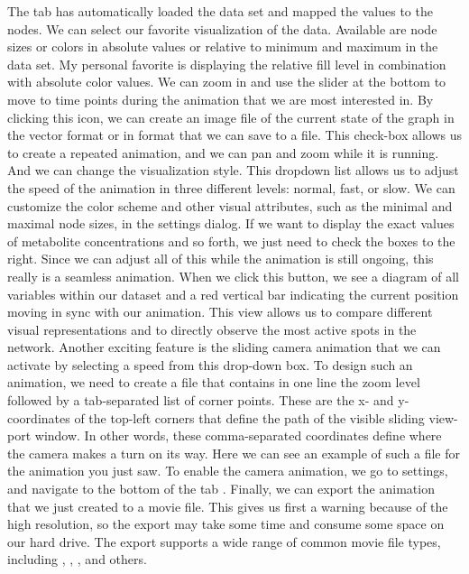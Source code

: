 The  tab has automatically loaded the data set and mapped the values to the nodes. 
We can select our favorite visualization of the data. Available are node sizes or colors in absolute values or relative to minimum and maximum in the data set.
My personal favorite is displaying the relative fill level in combination with absolute color values.
We can zoom in and use the slider at the bottom to move to time points during the animation that we are most interested in.
By clicking this icon, we can create an image file of the current state of the graph in the vector format \SVG or in \PNG format that we can save to a file.
This check-box allows us to create a repeated animation, and we can pan and zoom while it is running. And we can change the visualization style.
This dropdown list allows us to adjust the speed of the animation in three different levels: normal, fast, or slow.
We can customize the color scheme and other visual attributes, such as the minimal and maximal node sizes, in the settings dialog.
If we want to display the exact values of metabolite concentrations and so forth, we just need to check the boxes to the right.
Since we can adjust all of this while the animation is still ongoing, this really is a seamless animation.
When we click this button, we see a diagram of all variables within our dataset and a red vertical bar indicating the current position moving in sync with our animation.
This view allows us to compare different visual representations and to directly observe the most active spots in the network.
Another exciting feature is the sliding camera animation that we can activate by selecting a speed from this drop-down box.
To design such an animation, we need to create a \CSV file that contains in one line the zoom level followed by a tab-separated list of corner points.
These are the x- and y-coordinates of the top-left corners that define the path of the visible sliding view-port window.
In other words, these comma-separated coordinates define where the camera makes a turn on its way.
Here we can see an example of such a file for the animation you just saw.
To enable the camera animation, we go to settings, and navigate to the bottom of the tab .
Finally, we can export the animation that we just created to a movie file.
This gives us first a warning because of the high resolution, so the export may take some time and consume some space on our hard drive.
The export supports a wide range of common movie file types, including \AVI, \MOV, \MPG, and others.



